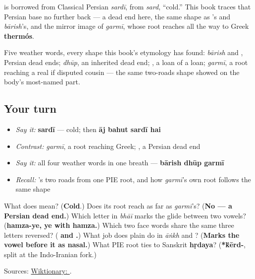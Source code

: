 \begin{cousinweb}
\textbf{} is borrowed from Classical Persian \emph{sardī}, from \emph{sard}, \textquotedblleft{}cold.\textquotedblright{} This book traces that Persian base no further back — a dead end here, the same shape as \textbf{}'s and \emph{bārish}'s, and the mirror image of \emph{garmī}, whose root reaches all the way to Greek \textbf{thermós}.

Five weather words, every shape this book's etymology has found: \emph{bārish} and \textbf{}, Persian dead ends; \emph{dhūp}, an inherited dead end; \textbf{}, a loan of a loan; \emph{garmī}, a root reaching a real if disputed cousin — the same two-roads shape \textbf{} showed on the body's most-named part.
\end{cousinweb}

\subsection*{Your turn}
\begin{itemize}
\raggedright
  \item \emph{Say it:} \textbf{sardī} — cold; then \textbf{āj bahut sardī hai}
  \item \emph{Contrast:} \emph{garmī}, a root reaching Greek; \textbf{}, a Persian dead end
  \item \emph{Say it:} all four weather words in one breath — \textbf{bārish dhūp  garmī }
  \item \emph{Recall:} \textbf{}'s two roads from one PIE root, and how \emph{garmī}'s own root follows the same shape
\end{itemize}

\begin{tcolorbox}[breakable,colback=teal!4,colframe=teal!35!black,title={Before you move on}]
What does \textbf{} mean? (\textbf{Cold}.) Does its root reach as far as \emph{garmī}'s? (\textbf{No — a Persian dead end.}) Which letter in \emph{bhāī} marks the glide between two vowels? (\textbf{hamza-ye, ye with hamza.}) Which two face words share the same three letters reversed? (\textbf{ and .}) What job does plain \textbf{} do in \emph{āṅkh} and \textbf{}? (\textbf{Marks the vowel before it as nasal.}) What PIE root ties \textbf{} to Sanskrit \textbf{hṛdaya}? (\textbf{*\'{k}ērd-}, split at the Indo-Iranian fork.)

Sources: \href{https://en.wiktionary.org/wiki/\%D8\%B3\%D8\%B1\%D8\%AF\%DB\%8C}{Wiktionary: }.
\end{tcolorbox}
